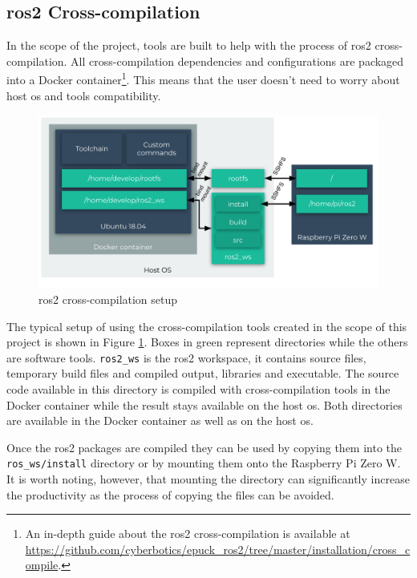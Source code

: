 \subsection{\ac{ros2} Cross-compilation}
In the scope of the project, tools are built to help with the process of \ac{ros2} cross-compilation.
All cross-compilation dependencies and configurations are packaged into a Docker container\footnote{An in-depth guide about the \ac{ros2} cross-compilation is available at \url{https://github.com/cyberbotics/epuck_ros2/tree/master/installation/cross_compile}.}.
This means that the user doesn't need to worry about host \ac{os} and tools compatibility. 

\begin{figure}[H]
    \centering
    \includegraphics[width=\textwidth]{physical/figures/cross_compilation.pdf}
    \caption{\ac{ros2} cross-compilation setup}
    \label{fig:physical:cross_compilation}
\end{figure}

The typical setup of using the cross-compilation tools created in the scope of this project is shown in Figure \ref{fig:physical:cross_compilation}.
Boxes in green represent directories while the others are software tools.
\texttt{ros2\_ws} is the \ac{ros2} workspace, it contains source files, temporary build files and compiled output, libraries and executable.
The source code available in this directory is compiled with cross-compilation tools in the Docker container while the result stays available on the host \ac{os}.
Both directories are available in the Docker container as well as on the host \ac{os}.

Once the \ac{ros2} packages are compiled they can be used by copying them into the \texttt{ros\_ws/install} directory or by mounting them onto the Raspberry Pi Zero W.
It is worth noting, however, that mounting the directory can significantly increase the productivity as the process of copying the files can be avoided.

